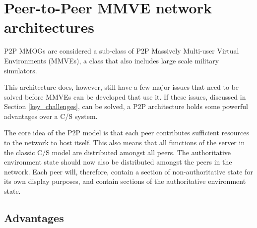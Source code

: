 \section{Peer-to-Peer MMVE network architectures}
\label{p2p_network_architectures}

P2P MMOGs are considered a sub-class of P2P Massively Multi-user Virtual Environments (MMVEs), a class that also includes large scale military simulators.

This architecture does, however, still have a few major issues that need to be solved before MMVEs can be developed that use it. If these issues, discussed in Section \ref{key_challenges}, can be solved, a P2P architecture holds some powerful advantages over a C/S system.

The core idea of the P2P model is that each peer contributes sufficient resources to the network to host itself. This also means that all functions of the server in the classic C/S model are distributed amongst all peers. The authoritative environment state should now also be distributed amongst the peers in the network. Each peer will, therefore, contain a section of non-authoritative state for its own display purposes, and contain sections of the authoritative environment state.

\subsection{Advantages}
\label{p2p_mmve_advantages}

